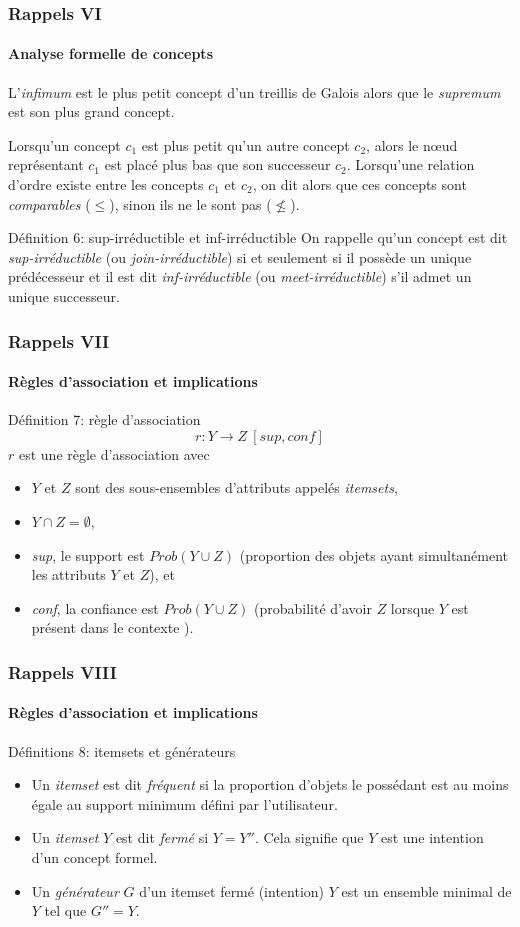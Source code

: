 \documentclass[french]{beamer}
\begin{document}
\begin{frame}
\frametitle{Rappels VI}
\framesubtitle{Analyse formelle de concepts}
L'\emph{infimum} est le plus petit concept d'un treillis de Galois alors que le \emph{supremum} est son plus grand concept.

Lorsqu'un concept $c_1$ est plus petit qu'un autre concept $c_2$, alors le nœud représentant $c_1$ est placé plus bas que son successeur $c_2$. Lorsqu'une relation d'ordre existe entre les concepts $c_1$ et $c_2$, on dit alors que ces concepts sont \textit{comparables} ($\leq$), sinon ils ne le sont pas ($\not\leq$).
\begin{block}{Définition 6: sup-irréductible et inf-irréductible}
On rappelle qu'un concept est dit \emph{sup-irréductible} (ou \emph{join-irréductible}) si et seulement si il possède un unique prédécesseur et il est dit \emph{inf-irréductible} (ou \emph{meet-irréductible}) s'il admet un unique successeur.
\end{block}
\end{frame}

\begin{frame}
\frametitle{Rappels VII}
\framesubtitle{Règles d'association et implications}
\begin{block}{Définition 7: règle d'association}
$$r : Y \rightarrow Z\ [sup, conf]$$
$r$ est une règle d'association avec
\begin{itemize}
\item $Y$ et $Z$ sont des sous-ensembles d'attributs appelés \textit{itemsets},
\item $Y \cap Z = \emptyset$,
\item \textit{sup}, le support est $Prob(Y \cup Z)$ (proportion des objets ayant simultanément les attributs $Y$ et $Z$), et
\item \textit{conf}, la confiance est $Prob(Y \cup Z)$ (probabilité d'avoir $Z$ lorsque $Y$ est présent dans le contexte \context).
\end{itemize}
\end{block}
\end{frame}

\begin{frame}
\frametitle{Rappels VIII}
\framesubtitle{Règles d'association et implications}
\begin{block}{Définitions 8: itemsets et générateurs}
\begin{itemize}
\item Un \emph{itemset} est dit \emph{fréquent} si la proportion d'objets le possédant est au moins égale au support minimum défini par l'utilisateur.
\item Un \emph{itemset} $Y$ est dit \emph{fermé} si $Y = Y''$. Cela signifie que $Y$ est une intention d'un concept formel.
\item Un \emph{générateur} $G$ \parencite{Pfaltz2002} d'un itemset fermé (intention) $Y$ est un ensemble minimal de  $Y$
tel que $G''= Y$. 
\end{itemize}
\end{block}
\end{frame}
\end{document}
